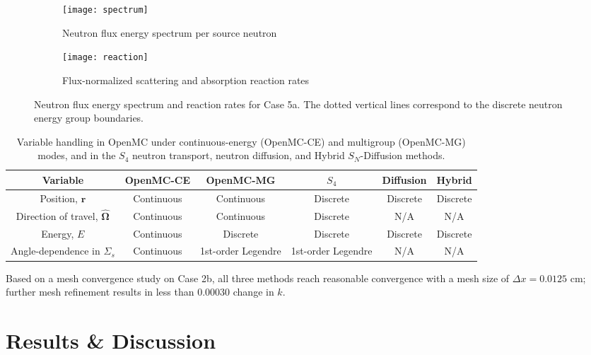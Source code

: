 \begin{figure}[htb!]
  \centering
  \begin{subfigure}[t]{.49\textwidth}
    \centering
    \texttt{[image: spectrum]}
    \caption{Neutron flux energy spectrum per source neutron}
    \label{fig:spectrum}
  \end{subfigure}
  \hfill
  \begin{subfigure}[t]{.49\textwidth}
    \centering
    \texttt{[image: reaction]}
    \caption{Flux-normalized scattering and absorption reaction rates}
    \label{fig:reaction}
  \end{subfigure}
  \caption{Neutron flux energy spectrum and reaction rates for Case 5a. The dotted vertical lines
  correspond to the discrete neutron energy group boundaries.}
  \label{fig:spec-reac}
\end{figure}
%
\begin{table}[tb!]
  \centering
  \footnotesize
  \caption{Variable handling in OpenMC under continuous-energy (OpenMC-CE) and multigroup
  (OpenMC-MG) modes, and in the $S_4$ neutron transport, neutron diffusion, and Hybrid
  $S_N$-Diffusion methods. }
  \begin{tabular}{c c c c c c}
    \toprule
    Variable & OpenMC-CE & OpenMC-MG & $S_4$ & Diffusion & Hybrid \\
    \midrule
    Position, $\bm{r}$ & Continuous & Continuous & Discrete & Discrete & Discrete \\
    Direction of travel, $\bm{\hat{\Omega}}$ & Continuous & Continuous & Discrete & N/A & N/A \\
    Energy, $E$ & Continuous & Discrete & Discrete & Discrete & Discrete \\
    Angle-dependence in $\Sigma_s$ & Continuous & 1st-order Legendre & 1st-order Legendre
    & N/A & N/A \\
    \bottomrule
  \end{tabular}
  \label{table:var}
\end{table}

Based on a mesh convergence study on Case 2b, all three methods reach reasonable convergence
with a mesh size of $\Delta x=0.0125$ cm; further mesh refinement results in less than 0.00030
change in $k$.

\section{Results \& Discussion} \label{sec:prelim-results}

